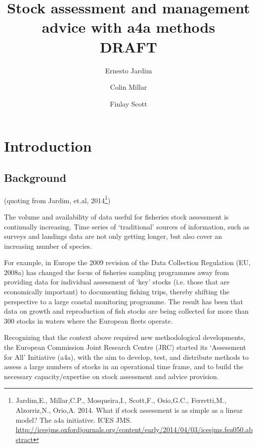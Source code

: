 \documentclass[a4paper,english,10pt]{article}\usepackage[]{graphicx}\usepackage[]{color}
\begin{document}

\title{Stock assessment and management advice with a4a methods \\ DRAFT}

\author[1]{Ernesto Jardim}
\author[1]{Colin Millar}
\author[1]{Finlay Scott}

\maketitle
\tableofcontents
\newpage

\section{Introduction}

\subsection{Background}

(quoting from Jardim, et.al, 2014\footnote{Jardim,E., Millar,C.P., Mosqueira,I., Scott,F., Osio,G.C., Ferretti,M., Alzorriz,N., Orio,A. 2014. What if stock assessment is as simple as a linear model? The a4a initiative. ICES JMS. \url{http://icesjms.oxfordjournals.org/content/early/2014/04/03/icesjms.fsu050.abstract}
})

The volume and availability of data useful for fisheries stock assessment is continually increasing. Time series of ‘traditional’ sources of information, such as surveys and landings data are not only getting longer, but also cover an increasing number of species.

For example, in Europe the 2009 revision of the Data Collection Regulation (EU, 2008a) has changed the focus of fisheries sampling programmes away from providing data for individual assessment of ‘key’ stocks (i.e. those that are economically important) to documenting fishing trips, thereby shifting the perspective to a large coastal monitoring programme. The result has been that data on growth and reproduction of fish stocks are being collected for more than 300 stocks in waters where the European fleets operate.

Recognizing that the context above required new methodological developments, the European Commission Joint Research Centre (JRC) started its ‘Assessment for All’ Initiative (a4a), with the aim to develop, test, and distribute methods to assess a large numbers of stocks in an operational time frame, and to build the necessary capacity/expertise on stock assessment and advice provision. 
\end{document}

